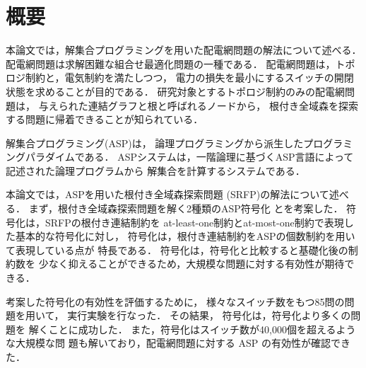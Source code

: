 \chapter*{概要}

本論文では，解集合プログラミングを用いた配電網問題の解法について述べる．
配電網問題は求解困難な組合せ最適化問題の一種である．
配電網問題は，トポロジ制約と，電気制約を満たしつつ，
電力の損失を最小にするスイッチの開閉状態を求めることが目的である．
研究対象とするトポロジ制約のみの配電網問題は，
与えられた連結グラフと根と呼ばれるノードから，
根付き全域森を探索する問題に帰着できることが知られている．

解集合プログラミング(ASP)は，
論理プログラミングから派生したプログラミングパラダイムである．
ASPシステムは，一階論理に基づくASP言語によって記述された論理プログラムから
解集合を計算するシステムである．

本論文では，ASPを用いた根付き全域森探索問題
(SRFP)の解法について述べる．
まず，根付き全域森探索問題を解く2種類のASP符号化
とを考案した．
符号化は，SRFPの根付き連結制約を
at-least-one制約とat-most-one制約で表現した基本的な符号化に対し，
符号化は，根付き連結制約をASPの個数制約を用いて表現している点が
特長である．
符号化は，符号化と比較すると基礎化後の制約数を
少なく抑えることができるため，大規模な問題に対する有効性が期待できる．

考案した符号化の有効性を評価するために，
様々なスイッチ数をもつ85問の問題を用いて，
実行実験を行なった．
その結果，
符号化は，符号化より多くの問題を
解くことに成功した．
また，符号化はスイッチ数が40,000個を超えるような大規模な問
題も解いており，配電網問題に対する ASP の有効性が確認できた．

